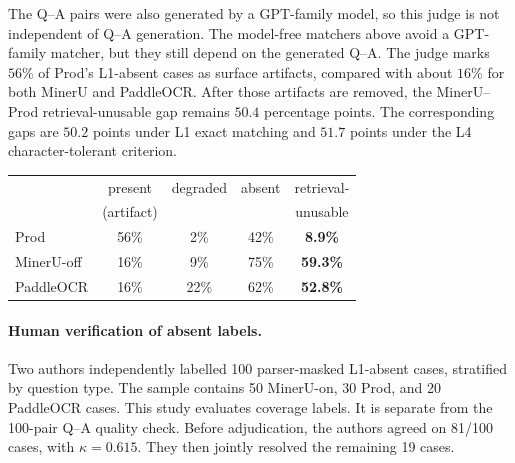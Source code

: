\documentclass[11pt]{article}
\begin{document}
The Q--A pairs were also generated by a GPT-family model, so this judge is not independent of Q--A generation. The model-free matchers above avoid a GPT-family matcher, but they still depend on the generated Q--A. The judge marks $56\%$ of Prod's L1-absent cases as surface artifacts, compared with about $16\%$ for both MinerU and PaddleOCR. After those artifacts are removed, the MinerU--Prod retrieval-unusable gap remains $50.4$ percentage points. The corresponding gaps are $50.2$ points under L1 exact matching and $51.7$ points under the L4 character-tolerant criterion.

\begin{center}
\begin{minipage}{\columnwidth}
\centering\footnotesize
\setlength{\tabcolsep}{3pt}
\begin{tabular}{lcccc}
\toprule
& present & degraded & absent & retrieval- \\
& (artifact) & & & unusable \\
\midrule
Prod & 56\% & 2\% & 42\% & \textbf{8.9\%} \\
MinerU-off & 16\% & 9\% & 75\% & \textbf{59.3\%} \\
PaddleOCR & 16\% & 22\% & 62\% & \textbf{52.8\%} \\
\bottomrule
\end{tabular}
\captionsetup{hypcap=false}
\label{tab:judge}
\end{minipage}
\end{center}

\paragraph{Human verification of absent labels.} Two authors independently labelled 100 parser-masked L1-absent cases, stratified by question type. The sample contains 50 MinerU-on, 30 Prod, and 20 PaddleOCR cases. This study evaluates coverage labels. It is separate from the 100-pair Q--A quality check. Before adjudication, the authors agreed on 81/100 cases, with $\kappa=0.615$. They then jointly resolved the remaining 19 cases.
\end{document}
